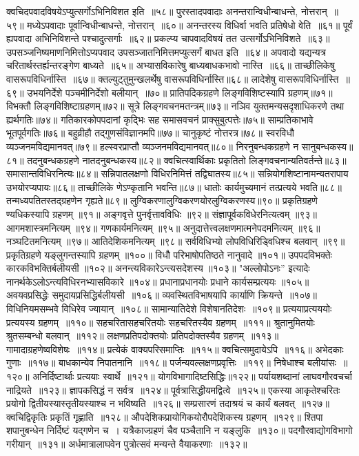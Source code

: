 क्वचिदपवादविषयेऽप्युत्सर्गोऽभिनिविशत इति~॥५८॥
पुरस्तादपवादाः अनन्तरान्विधीन्बाधन्ते, नोत्तरान्~॥५९॥
मध्येऽपवादाः पूर्वान्विधीन्बाधन्ते, नोत्तरान्~॥६०॥
अनन्तरस्य विधिर्वा भवति प्रतिषेधो वेति~॥६१॥
पूर्वं ह्यपवादा अभिनिविशन्ते पश्चादुत्सर्गाः~॥६२॥
प्रकल्प्य चापवादविषयं तत उत्सर्गोऽभिनिविशते~॥६३॥
उपसञ्जनिष्यमाणनिमित्तोऽप्यपवाद उपसञ्जातनिमित्तमप्युत्सर्गं बाधत इति~॥६४॥
अपवादो यद्यन्यत्र चरितार्थस्तर्ह्यन्तरङ्गेण बाध्यते~॥६५॥
अभ्यासविकारेषु बाध्यबाधकभावो नास्ति~॥६६॥
ताच्छीलिकेषु वासरूपविधिर्नास्ति~॥६७॥
क्तल्युट्‍तुमुन्खलर्थेषु वासरूपविधिर्नास्ति॥६८॥
लादेशेषु वासरूपविधिर्नास्ति~॥६९॥
उभयनिर्देशे पञ्चमीनिर्देशो बलीयान्~॥७०॥
प्रातिपदिकग्रहणे लिङ्गविशिष्टस्यापि ग्रहणम्॥७१॥
विभक्तौ लिङ्गविशिष्टाग्रहणम्॥७२॥
सूत्रे लिङ्गवचनमतन्त्रम्॥७३॥
नञिव युक्तमन्यसदृशाधिकरणे तथा ह्यर्थगतिः॥७४॥
गतिकारकोपपदानां कृद्भिः सह समासवचनं प्राक्सुबुत्पत्तेः॥७५॥
साम्प्रतिकाभावे भूतपूर्वगतिः॥७६॥
बहुव्रीहौ तद्गुणसंविज्ञानमपि॥७७॥
चानुकृष्टं नोत्तरत्र॥७८॥
स्वरविधौ व्यञ्जनमविद्यमानवत्॥७९॥
हल्स्वरप्राप्तौ व्यञ्जनमविद्यमानवत्॥८०॥
निरनुबन्धकग्रहणे न सानुबन्धकस्य॥८१॥
तदनुबन्धकग्रहणे नातदनुबन्धकस्य॥८२॥
क्वचित्स्वार्थिकाः प्रकृतितो लिङ्गवचनान्यतिवर्तन्ते॥८३॥
समासान्तविधिरनित्यः॥८४॥
सन्निपातलक्षणो विधिरनिमित्तं तद्विघातस्य॥८५॥
सन्नियोगशिष्टानामन्यतरापाय उभयोरप्यपायः॥८६॥
ताच्छीलिके णेऽण्कृतानि भवन्ति॥८७॥
धातोः कार्यमुच्यमानं तत्प्रत्यये भवति॥८८॥
तन्मध्यपतितस्तद्ग्रहणेन गृह्यते॥८९॥
लुग्विकरणालुग्विकरणयोरलुग्विकरणस्य॥९०॥
प्रकृतिग्रहणे ण्यधिकस्यापि ग्रहणम् ॥९१॥
अङ्गवृत्ते पुनर्वृत्तावविधिः ॥९२॥
संज्ञापूर्वकविधेरनित्यत्वम् ॥९३॥
आगमशास्त्रमनित्यम् ॥९४॥
गणकार्यमनित्यम् ॥९५॥
अनुदात्तेत्त्वलक्षणमात्मनेपदमनित्यम् ॥९६॥
नञ्घटितमनित्यम् ॥९७॥
आतिदेशिकमनित्यम् ॥९८॥
सर्वविधिभ्यो लोपविधिरिड्विधिश्च बलवान् ॥९९॥
प्रकृतिग्रहणे यङ्लुगन्तस्यापि ग्रहणम् ॥१००॥
विधौ परिभाषोपतिष्ठते नानुवादे ॥१०१॥
उपपदविभक्तेः कारकविभक्तिर्बलीयसी ॥१०२॥
अनन्त्यविकारेऽन्त्यसदेशस्य ॥१०३॥
"अल्लोपोऽनः'' इत्यादेः
नानर्थकेऽलोऽन्त्यविधिरनभ्यासविकारे ॥१०४॥
प्रधानाप्रधानयोः प्रधाने कार्यसम्प्रत्ययः ॥१०५॥
अवयवप्रसिद्धेः समुदायप्रसिद्धिर्बलीयसी~॥१०६॥
व्यवस्थितविभाषयापि कार्याणि क्रियन्ते~॥१०७॥
विधिनियमसम्भवे विधिरेव ज्यायान्~॥१०८॥
सामान्यातिदेशे विशेषानतिदेशः~॥१०९॥
प्रत्ययाप्रत्यययोः प्रत्ययस्य ग्रहणम्~॥११०॥
सहचरितासहचरितयोः सहचरितस्यैव ग्रहणम्~॥१११॥
श्रुतानुमितयोः श्रुतसम्बन्धो बलवान्~॥११२॥
लक्षणप्रतिपदोक्तयोः प्रतिपदोक्तस्यैव ग्रहणम्~॥११३॥
गामादाग्रहणेष्वविशेषः~॥११४॥
प्रत्येकं वाक्यपरिसमाप्तिः~॥११५॥
क्वचित्समुदायेऽपि~॥११६॥
अभेदकाः गुणाः~॥११७॥
बाधकान्येव निपातनानि~॥११८॥
पर्जन्यवल्लक्षणप्रवृत्तिः~॥११९॥
निषेधाश्च बलीयांसः~॥१२०॥
अनिर्दिष्टार्थाः प्रत्ययाः स्वार्थे~॥१२१॥
योगविभागादिष्टसिद्धिः॥१२२॥
पर्यायशब्दानां लाघवगौरवचर्चा नाद्रियते~॥१२३॥
ज्ञापकसिद्धं न सर्वत्र~॥१२४॥
पूर्वत्रासिद्धीयमद्वित्वे~॥१२५॥
एकस्या आकृतेश्चरितः प्रयोगो द्वितीयस्यास्तृतीयस्याश्च न भविष्यति~॥१२६॥
सम्प्रसारणं तदाश्रयं च कार्यं बलवत्~॥१२७॥
क्वचिद्विकृतिः प्रकृतिं गृह्णाति~॥१२८॥
औपदेशिकप्रायोगिकयोरौपदेशिकस्य ग्रहणम्~॥१२९॥
श्तिपा शपानुबन्धेन निर्दिष्टं यद्गणेन च~।
यत्रैकाज्ग्रहणं चैव पञ्चैतानि न यङ्लुकि~॥१३०॥
पदगौरवाद्योगविभागो गरीयान्~॥१३१॥
अर्धमात्रालाघवेन पुत्रोत्सवं मन्यन्ते वैयाकरणाः~॥१३२॥

